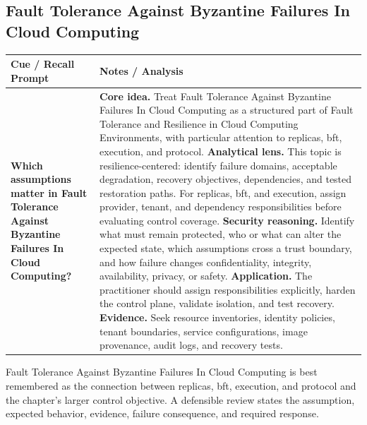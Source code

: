 \documentclass[11pt]{article}
\newcommand{\CornellHeader}{%
\rowcolor{Navy}\color{white}\bfseries Cue / Recall Prompt & \color{white}\bfseries Notes / Analysis\\\hline}
\newcommand{\CornellRow}[2]{%
\cellcolor{CueGray}\RaggedRight\textbf{#1} & \RaggedRight #2\\\hline}
\begin{document}
\subsection*{Fault Tolerance Against Byzantine Failures In Cloud Computing}
\begin{longtable}{>{\RaggedRight\arraybackslash}p{}|>{\RaggedRight\arraybackslash}p{}}
\CornellHeader
\CornellRow{Which assumptions matter in Fault Tolerance Against Byzantine Failures In Cloud Computing?}{\textbf{Core idea.} Treat Fault Tolerance Against Byzantine Failures In Cloud Computing as a structured part of Fault Tolerance and Resilience in Cloud Computing Environments, with particular attention to replicas, bft, execution, and protocol. \textbf{Analytical lens.} This topic is resilience-centered: identify failure domains, acceptable degradation, recovery objectives, dependencies, and tested restoration paths. For replicas, bft, and execution, assign provider, tenant, and dependency responsibilities before evaluating control coverage. \textbf{Security reasoning.} Identify what must remain protected, who or what can alter the expected state, which assumptions cross a trust boundary, and how failure changes confidentiality, integrity, availability, privacy, or safety. \textbf{Application.} The practitioner should assign responsibilities explicitly, harden the control plane, validate isolation, and test recovery. \textbf{Evidence.} Seek resource inventories, identity policies, tenant boundaries, service configurations, image provenance, audit logs, and recovery tests.}
\end{longtable}
\begin{topicsummary}
Fault Tolerance Against Byzantine Failures In Cloud Computing is best remembered as the connection between replicas, bft, execution, and protocol and the chapter's larger control objective. A defensible review states the assumption, expected behavior, evidence, failure consequence, and required response.
\end{topicsummary}
\end{document}
